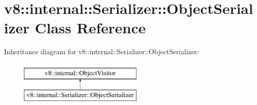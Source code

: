 \hypertarget{classv8_1_1internal_1_1Serializer_1_1ObjectSerializer}{}\section{v8\+:\+:internal\+:\+:Serializer\+:\+:Object\+Serializer Class Reference}
\label{classv8_1_1internal_1_1Serializer_1_1ObjectSerializer}
Inheritance diagram for v8\+:\+:internal\+:\+:Serializer\+:\+:Object\+Serializer\+:\begin{figure}[H]
\begin{center}
\leavevmode
\includegraphics[height=2.000000cm]{classv8_1_1internal_1_1Serializer_1_1ObjectSerializer}
\end{center}
\end{figure}
